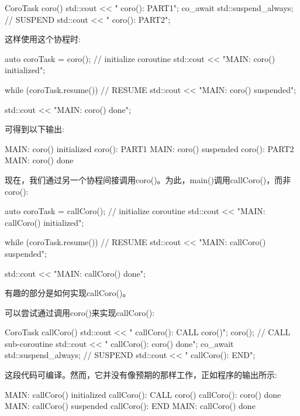 \begin{cpp}
CoroTask coro()
{
	std::cout << " coro(): PART1\n";
	co_await std::suspend_always{}; // SUSPEND
	std::cout << " coro(): PART2\n";
}
\end{cpp}

这样使用这个协程时:

\begin{cpp}
auto coroTask = coro(); // initialize coroutine
std::cout << "MAIN: coro() initialized\n";

while (coroTask.resume()) { // RESUME
	std::cout << "MAIN: coro() suspended\n";
}

std::cout << "MAIN: coro() done\n";
\end{cpp}

可得到以下输出:

\begin{shell}
MAIN: coro() initialized
    coro(): PART1
MAIN: coro() suspended
    coro(): PART2
MAIN: coro() done
\end{shell}

现在，我们通过另一个协程间接调用coro()。为此，main()调用callCoro()，而非coro():

\begin{cpp}
auto coroTask = callCoro(); // initialize coroutine
std::cout << "MAIN: callCoro() initialized\n";

while (coroTask.resume()) { // RESUME
	std::cout << "MAIN: callCoro() suspended\n";
}

std::cout << "MAIN: callCoro() done\n";
\end{cpp}

有趣的部分是如何实现callCoro()。


可以尝试通过调用coro()来实现callCoro():

\begin{cpp}
CoroTask callCoro()
{
	std::cout << " callCoro(): CALL coro()\n";
	coro(); // CALL sub-coroutine
	std::cout << " callCoro(): coro() done\n";
	co_await std::suspend_always{}; // SUSPEND
	std::cout << " callCoro(): END\n";
}
\end{cpp}

这段代码可编译。然而，它并没有像预期的那样工作，正如程序的输出所示:

\begin{shell}
MAIN: callCoro() initialized
  callCoro(): CALL coro()
  callCoro(): coro() done
MAIN: callCoro() suspended
  callCoro(): END
MAIN: callCoro() done
\end{shell}

